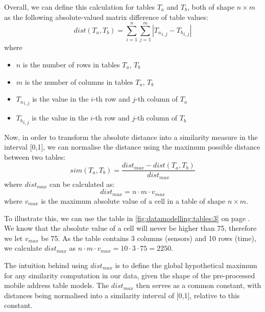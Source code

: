 \par
Overall, we can define this calculation for tables $T_a$ and $T_b$, both of shape $n \times m$ as the following absolute-valued matrix difference of table values:
\begin{equation*}
    dist(T_a,T_b) = \sum_{i=1}^n \sum_{j=1}^m |{T_a}_{i,j} - {T_b}_{i,j}|
\end{equation*}
where
\begin{itemize}
    \item $n$ is the number of rows in tables $T_a$, $T_b$
    \item $m$ is the number of columns in tables $T_a$, $T_b$
    \item ${T_a}_{i,j}$ is the value in the $i$-th row and $j$-th column of $T_a$
    \item ${T_b}_{i,j}$ is the value in the $i$-th row and $j$-th column of $T_b$
\end{itemize}

\par
Now, in order to transform the absolute distance into a similarity measure in the interval [0,1], we can normalise the distance using the maximum possible distance between two tables:
\begin{equation*}
    sim(T_a,T_b) = \frac{dist_{max} - dist(T_a,T_b)}{dist_{max}}
\end{equation*}
where $dist_{max}$ can be calculated as:
\begin{equation*}
    dist_{max} = n \cdot m \cdot v_{max}
\end{equation*}
where $v_{max}$ is the maximum absolute value of a cell in a table of shape $n \times m$.\\

\par
To illustrate this, we can use the table in \cref{fig:datamodelling:tables:3} on page \pageref{fig:datamodelling:tables:3}. We know that the absolute value of a cell will never be higher than 75, therefore we let $v_{max}$ be 75. As the table contains 3 columns (sensors) and 10 rows (time), we calculate $dist_{max}$ as $n \cdot m \cdot v_{max} = 10 \cdot 3 \cdot 75 = 2250$. 

\par
The intuition behind using $dist_{max}$ is to define the global hypothetical maximum for any similarity computation in our data, given the shape of the pre-processed mobile address table models. The $dist_{max}$ then serves as a common constant, with distances being normalised into a similarity interval of [0,1], relative to this constant.

